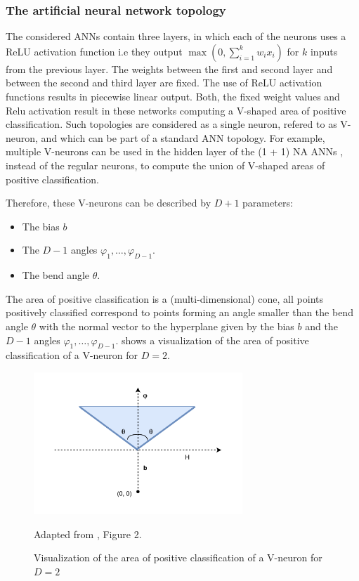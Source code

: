 \subsubsection{The artificial neural network topology}

The considered ANNs contain three layers, in which each of the neurons uses a ReLU activation function i.e they output $\max(0, \sum_{i=1}^k w_i x_i)$ for
$k$ inputs from the previous layer.
The weights between the first and second layer and between the second and third layer are fixed.
The use of ReLU activation functions results in piecewise linear output. Both, the fixed weight values and Relu activation result in these networks computing a V-shaped area of positive classification.
Such topologies are considered as a single neuron, refered to as V-neuron, and which can be part of a standard ANN topology. For example, multiple V-neurons can be used in the hidden layer of the
(1 + 1) NA ANNs \cite{na}, instead of the regular neurons, to compute the union of V-shaped areas of positive classification.

Therefore, these V-neurons can be described by $D + 1$ parameters:

\begin{itemize}
    \item The bias $b$
    \item The $D - 1$ angles $\varphi_1, \ldots, \varphi_{D-1}$.
    \item The bend angle $\theta$.
\end{itemize}

The area of positive classification is a (multi-dimensional) cone, all points positively classified correspond to points forming an angle smaller than the bend
angle $\theta$ with the normal vector to the hyperplane given by the bias $b$ and the $D -1$ angles $\varphi_1, \ldots, \varphi_{D-1}$.
 shows a visualization of the area of positive classification of a V-neuron for $D = 2$.

\begin{figure}
    \centering
    \includegraphics[width=0.7\textwidth]{Pictures/bna_cone}
    \caption{Visualization of the area of positive classification of a V-neuron for $D = 2$}{Adapted from \cite{bna}, Figure 2.}
    \label{fig:bna-cone}
\end{figure}

